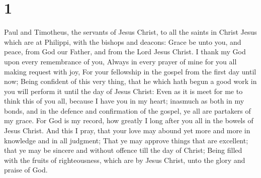 \hypertarget{section}{%
\section{1}\label{section}}

 Paul and Timotheus, the servants of Jesus Christ, to all
the saints in Christ Jesus which are at Philippi, with the bishops and
deacons:  Grace be unto you, and peace, from God our
Father, and from the Lord Jesus Christ.  I thank my God
upon every remembrance of you,  Always in every prayer of
mine for you all making request with joy,  For your
fellowship in the gospel from the first day until now; 
Being confident of this very thing, that he which hath begun a good work
in you will perform it until the day of Jesus Christ: 
Even as it is meet for me to think this of you all, because I have you
in my heart; inasmuch as both in my bonds, and in the defence and
confirmation of the gospel, ye all are partakers of my grace.
 For God is my record, how greatly I long after you all in
the bowels of Jesus Christ.  And this I pray, that your
love may abound yet more and more in knowledge and in all judgment;
 That ye may approve things that are excellent; that ye
may be sincere and without offence till the day of Christ;
 Being filled with the fruits of righteousness, which are
by Jesus Christ, unto the glory and praise of God.

